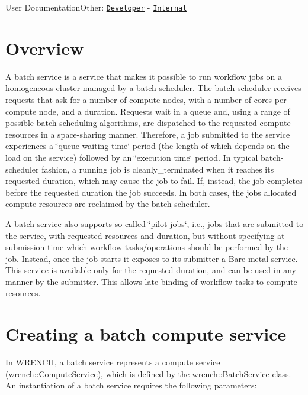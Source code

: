 User DocumentationOther\+: \href{../developer/guide-batch.html}{\tt Developer} -\/ \href{../internal/guide-batch.html}{\tt Internal}\hypertarget{guide-batch_guide-batch-overview}{}\section{Overview}\label{guide-batch_guide-batch-overview}
A batch service is a service that makes it possible to run workflow jobs on a homogeneous cluster managed by a batch scheduler. The batch scheduler receives requests that ask for a number of compute nodes, with a number of cores per compute node, and a duration. Requests wait in a queue and, using a range of possible batch scheduling algorithms, are dispatched to the requested compute resources in a space-\/sharing manner. Therefore, a job submitted to the service experiences a \char`\"{}queue waiting time\char`\"{} period (the length of which depends on the load on the service) followed by an \char`\"{}execution time\char`\"{} period. In typical batch-\/scheduler fashion, a running job is cleanly\+\_\+terminated when it reaches its requested duration, which may cause the job to fail. If, instead, the job completes before the requested duration the job succeeds. In both cases, the job\textquotesingle{}s allocated compute resources are reclaimed by the batch scheduler.

A batch service also supports so-\/called \char`\"{}pilot jobs\char`\"{}, i.\+e., jobs that are submitted to the service, with requested resources and duration, but without specifying at submission time which workflow tasks/operations should be performed by the job. Instead, once the job starts it exposes to its submitter a \hyperlink{guide-baremetal}{Bare-\/metal} service. This service is available only for the requested duration, and can be used in any manner by the submitter. This allows late binding of workflow tasks to compute resources.\hypertarget{guide-batch_guide-batch-creating}{}\section{Creating a batch compute service}\label{guide-batch_guide-batch-creating}
In W\+R\+E\+N\+CH, a batch service represents a compute service ({\ttfamily \hyperlink{classwrench_1_1_compute_service}{wrench\+::\+Compute\+Service}}), which is defined by the {\ttfamily \hyperlink{classwrench_1_1_batch_service}{wrench\+::\+Batch\+Service}} class. An instantiation of a batch service requires the following parameters\+:


